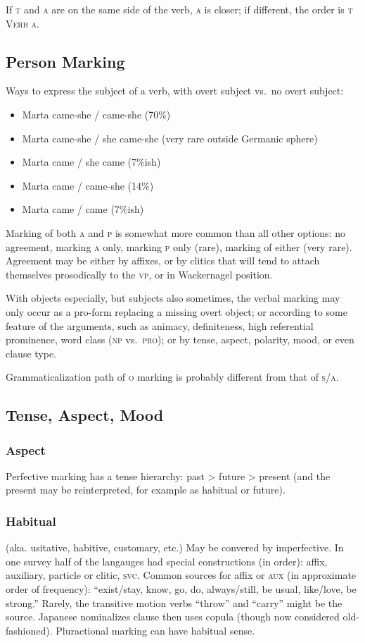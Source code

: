 \documentclass[11pt]{article}
\newcommand{\I}[1]{\textsc{#1}}   %
\newenvironment{grammarlist}%
 {\begin{itemize}\addtolength{\itemsep}{-0.5\baselineskip}\ignorespaces}%
 {\end{itemize}\ignorespacesafterend}
\begin{document}
If \I{t} and \I{a} are on the same side of the verb, \I{a} is closer;
if different, the order is \I{t Verb a}.

\subsection{Person Marking}
Ways to express the subject of a verb, with overt subject vs.\ no
overt subject:
\begin{grammarlist}
  \item Marta came-she / came-she (70\%)
  \item Marta came-she / she came-she (very rare outside Germanic sphere)
  \item Marta came / she came (7\%ish)
  \item Marta came / came-she (14\%)
  \item Marta came / came (7\%ish)
\end{grammarlist}

Marking of both \I{a} and \I{p} is somewhat more common than all other
options: no agreement, marking \I{a} only, marking \I{p} only (rare),
marking of either (very rare).  Agreement may be either by affixes, or
by clitics that will tend to attach themselves prosodically to the
\I{vp}, or in Wackernagel position.

With objects especially, but subjects also sometimes, the verbal
marking may only occur as a pro-form replacing a missing overt object;
or according to some feature of the arguments, such as animacy,
definiteness, high referential prominence, word class (\I{np}
vs.\ \I{pro}); or by tense, aspect, polarity, mood, or even clause
type.

Grammaticalization path of \I{o} marking is probably different from
that of \I{s/a}.


\subsection{Tense, Aspect, Mood}

\subsubsection{Aspect} Perfective marking has a tense hierarchy: past
> future > present (and the present may be reinterpreted, for example
as habitual or future).

\subsubsection{Habitual}
(aka. usitative, habitive, customary, etc.)
May be convered by imperfective.  In one survey half of the langauges
had special constructions (in order): affix, auxiliary, particle or
clitic, \I{svc}.  Common sources for affix or \I{aux} (in approximate
order of frequency): ``exist/stay, know, go, do, always/still, be
usual, like/love, be strong.''  Rarely, the transitive motion verbs
``throw'' and ``carry'' might be the source.  Japanese nominalizes
clause then uses copula (though now considered old-fashioned).
Pluractional marking can have habitual sense.
\end{document}
